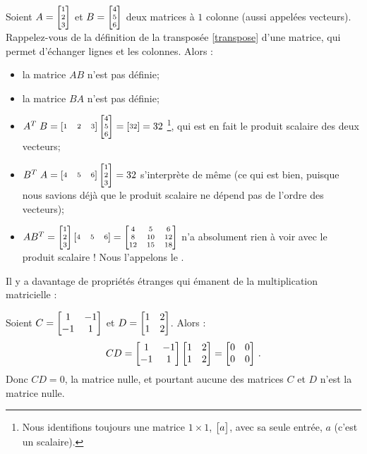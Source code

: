 \begin{myexample}
Soient $A =\scriptsize \left[ \begin{matrix} 1 \\2 \\3 \end{matrix} \right]$ et $B =\scriptsize \left[ \begin{matrix} 4\\5\\6 \end{matrix} \right]$ deux matrices à $1$ colonne
(aussi appelées vecteurs).  Rappelez-vous de la définition de la transpos\'ee \ref{transpose} d'une matrice, qui permet d'échanger
lignes et les colonnes.  Alors :
\begin{itemize}
\item la matrice $AB$ n'est pas définie;
\item la matrice $BA$ n'est pas définie;
\item $A^T \; B = \scriptsize\left[ \begin{matrix} 1&2&3 \end{matrix} \right]\left[ \begin{matrix} 4\\5\\6 \end{matrix} \right] = \left[ \begin{matrix} 32 \end{matrix} \right] = 32$  \footnote{Nous identifions toujours une matrice $1\times 1$, $\left[ \begin{matrix} a \end{matrix} \right]$, avec sa seule entrée, $a$ (c'est un scalaire).}, qui est en fait le produit scalaire des deux vecteurs;
\item $B^T \; A = \scriptsize\left[ \begin{matrix} 4&5&6 \end{matrix} \right]\left[ \begin{matrix} 1 \\2 \\3 \end{matrix} \right] = 32$ s'interpr\`ete de même (ce qui est bien, 
puisque nous savions déjà que le produit scalaire ne dépend pas de l'ordre des vecteurs);
\item $AB^T = \scriptsize\left[ \begin{matrix} 1 \\2 \\3 \end{matrix} \right]\left[ \begin{matrix} 4&5&6 \end{matrix} \right] = \left[ \begin{matrix} 4 & 5 & 6\\ 8 & 10 & 12\\ 12 & 15 & 18 \end{matrix} \right]$ n'a absolument rien à voir avec le produit scalaire !  Nous l'appelons le .
\end{itemize}
\end{myexample}


Il y a davantage de propri\'et\'es étranges qui émanent de la multiplication matricielle :

\begin{myexample}\label{prod-is-0}
Soient $C = \left[ \begin{matrix} 1 & -1\\-1&1 \end{matrix} \right]$ et $D = \left[ \begin{matrix} 1 & 2\\ 1& 2 \end{matrix} \right]$.  Alors :
$$
CD =  \left[ \begin{matrix} 1 & -1\\-1&1 \end{matrix} \right] \left[ \begin{matrix} 1 & 2\\ 1& 2 \end{matrix} \right] = \left[ \begin{matrix} 0&0\\0&0 \end{matrix} \right]\,.
$$
Donc $CD = 0$, la matrice nulle, et pourtant aucune des matrices $C$ et $D$ n'est la matrice nulle.
\end{myexample}


